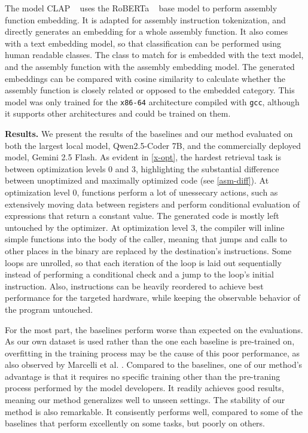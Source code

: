 The model CLAP ~\cite{CLAP} uses the RoBERTa ~\cite{RoBERTa} base model to perform assembly function embedding.
It is adapted for assembly instruction tokenization, and directly generates an embedding for
a whole assembly function. It also comes with a text embedding model, so that classification can
be performed using human readable classes. The class to match for is embedded with the text model, and the
assembly function with the assembly embedding model. The generated embeddings can be compared with cosine similarity to
calculate whether the assembly function is closely related or opposed to the embedded category. This model was only trained
for the \texttt{x86-64} architecture compiled with \texttt{gcc}, although it supports other architectures and could be trained on
them.


\noindent \textbf{Results.} We present the results of the baselines and our method evaluated on both the
largest local model, Qwen2.5-Coder 7B, and the commercially deployed model, Gemini 2.5 Flash.
As evident in \autoref{x-opt}, the hardest retrieval task is between optimization levels \(0\) and \(3\),
highlighting the substantial difference between unoptimized and maximally optimized code (see \autoref{asm-diff}).
At optimization level \(0\), functions perform a lot of unessecary actions, such as extensively moving
data between registers and perform conditional evaluation of expressions that return a constant value. The generated code
is mostly left untouched by the optimizer. At optimization level \(3\), the compiler will inline simple functions into the
body of the caller, meaning that jumps and calls to other places in the binary are replaced by the destination's instructions.
Some loops are unrolled, so that each iteration of the loop is laid out sequentially instead of performing a conditional check
and a jump to the loop's initial instruction. Also, instructions can be heavily reordered to achieve best performance for the targeted
hardware, while keeping the observable behavior of the program untouched.

For the most part, the baselines perform worse than expected on the evaluations. As our own dataset is used
rather than the one each baseline is pre-trained on, overfitting in the training process may be the cause of this poor performance,
as also observed by Marcelli et al. \cite{cisco}. Compared to the baselines, one of our method's advantage is that it requires no
specific training other than the pre-traning process performed by the model developers. It readily achieves good results,
meaning our method generalizes well to unseen settings. The stability of our method is also remarkable. It consisently
performs well, compared to some of the baselines that perform excellently on some tasks, but poorly on others.

